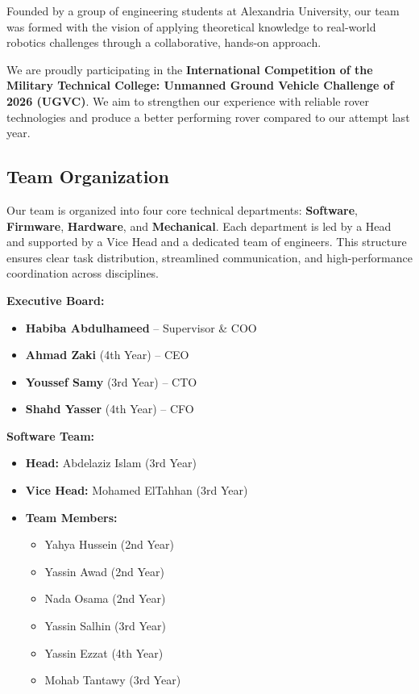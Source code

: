 \documentclass[12pt,a4paper,twocolumn]{article}
\begin{document}
Founded by a group of engineering students at Alexandria University, our team was formed with the vision of applying theoretical knowledge to real-world robotics challenges through a collaborative, hands-on approach.

We are proudly participating in the \textbf{International Competition of the Military Technical College: Unmanned Ground Vehicle Challenge of 2026 (UGVC)}.
We aim to strengthen our experience with reliable rover technologies and produce a better performing rover compared to our attempt last year.

\subsection{Team Organization}

Our team is organized into four core technical departments: \textbf{Software}, \textbf{Firmware}, \textbf{Hardware}, and \textbf{Mechanical}.
Each department is led by a Head and supported by a Vice Head and a dedicated team of engineers. This structure ensures clear task distribution, streamlined communication, and high-performance coordination across disciplines.

\textbf{Executive Board:}
\begin{itemize}
    \setlength{\itemsep}{1pt}
    \setlength{\parskip}{0pt}
    \setlength{\parsep}{0pt}
    \item \textbf{Habiba Abdulhameed} -- Supervisor \& COO
    \item \textbf{Ahmad Zaki} (4th Year) -- CEO
    \item \textbf{Youssef Samy} (3rd Year) -- CTO
    \item \textbf{Shahd Yasser} (4th Year) -- CFO
\end{itemize}

\textbf{Software Team:}
\begin{itemize}
    \setlength{\itemsep}{1pt}
    \setlength{\parskip}{0pt}
    \setlength{\parsep}{0pt}
    \item \textbf{Head:} Abdelaziz Islam (3rd Year)
    \item \textbf{Vice Head:} Mohamed ElTahhan (3rd Year)
    \item \textbf{Team Members:}
    \begin{itemize}
        \setlength{\itemsep}{1pt}
        \setlength{\parskip}{0pt}
        \setlength{\parsep}{0pt}
        \item Yahya Hussein (2nd Year)
        \item Yassin Awad (2nd Year)
        \item Nada Osama (2nd Year)
        \item Yassin Salhin (3rd Year)
        \item Yassin Ezzat (4th Year)
        \item Mohab Tantawy (3rd Year)
    \end{itemize}
\end{itemize}
\end{document}
